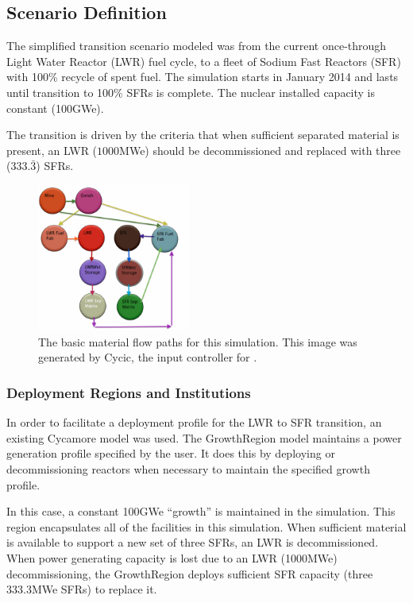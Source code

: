 \subsection{Scenario Definition}
The simplified transition scenario modeled was from the current once-through
Light Water Reactor (LWR) fuel cycle, to a fleet of Sodium Fast Reactors (SFR)
with 100\% recycle of spent fuel.  The simulation starts in January 2014 and
lasts until transition to 100\% SFRs is complete. The nuclear installed
capacity is constant (100GWe).

The transition is driven by the criteria that when sufficient separated
material is present, an LWR ($1000$MWe) should be decommissioned and replaced
with three ($333.\bar{3}$) SFRs.

\begin{figure}[htpb!]
\begin{center}
\includegraphics[width=0.45\textwidth]{cycic_img.eps}
\end{center}
\caption{The basic material flow paths for this simulation. This image was 
generated by Cycic, the input controller for \Cyclus 
\cite{flannagan_cycic_2013}.}
\label{fig:cycic_img}
\end{figure}

\subsubsection{Deployment Regions and Institutions}

In order to facilitate a deployment profile for the LWR to SFR transition, an 
existing Cycamore model was used. The GrowthRegion model maintains a 
power generation profile specified by the user. It does this by deploying or 
decommissioning reactors when necessary to maintain the specified growth 
profile.  

In this case, a constant 100GWe ``growth'' is maintained in the simulation. 
This region encapsulates all of the facilities in this simulation. 
When sufficient material is available to support a new set of three SFRs, an 
LWR is decommissioned. When power generating capacity is lost due to an LWR 
(1000MWe) decommissioning, the GrowthRegion deploys sufficient SFR capacity 
(three 333.3MWe SFRs) to replace it. 

